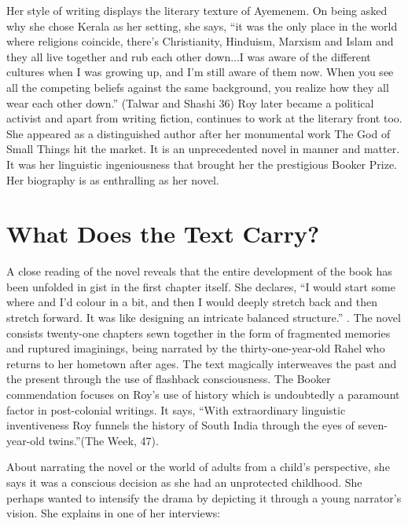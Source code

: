 Her  style  of  writing  displays  the  literary  texture  of  Ayemenem.  On  being  asked  why  she  chose  Kerala  as  her  setting,  she  says,  “it  was  the  only  place  in  the  world  where  religions  coincide,  there’s  Christianity,  Hinduism,  Marxism  and  Islam  and  they  all  live  together  and  rub  each  other  down...I  was  aware  of  the  different  cultures  when  I  was  growing  up,  and  I’m  still  aware  of  them  now.  When  you  see  all  the  competing  beliefs  against  the  same  background,  you  realize  how  they  all  wear  each  other  down.” (Talwar and Shashi 36)    Roy  later  became  a  political  activist  and  apart  from  writing  fiction,  continues  to  work  at  the  literary  front  too.  She  appeared  as  a  distinguished  author  after  her  monumental  work  The  God  of  Small  Things  hit  the  market.  It  is  an  unprecedented  novel  in  manner  and  matter.  It  was  her  linguistic  ingeniousness  that  brought  her  the  prestigious  Booker  Prize.  Her  biography  is  as  enthralling  as  her  novel.

\section{What Does the Text Carry?}

A  close  reading  of  the  novel  reveals  that  the  entire  development  of  the  book  has  been  unfolded  in  gist  in  the  first  chapter  itself.  She  declares,  “I  would  start  some  where  and  I’d  colour  in  a  bit,  and  then  I  would  deeply  stretch  back  and  then  stretch  forward.  It  was  like  designing  an  intricate  balanced  structure.”  \parencite{TalwarShashi}.  The  novel  consists  twenty-one  chapters  sewn  together  in  the  form  of  fragmented  memories  and  ruptured  imaginings,  being  narrated  by  the  thirty-one-year-old  Rahel  who  returns  to  her  hometown  after  ages.  The  text  magically  interweaves  the  past  and  the  present  through  the  use  of  flashback  consciousness.  The  Booker  commendation  focuses  on  Roy’s  use  of  history  which  is  undoubtedly  a  paramount  factor  in  post-colonial  writings.  It  says,  “With  extraordinary  linguistic  inventiveness  Roy  funnels  the  history  of  South  India  through  the  eyes  of  seven-year-old  twins.”(The  Week,  47).


About  narrating  the  novel  or  the  world  of  adults  from  a  child’s  perspective,  she  says  it  was  a  conscious  decision  as  she  had  an  unprotected  childhood.  She  perhaps  wanted  to  intensify  the  drama  by  depicting  it  through  a  young  narrator’s  vision.  She  explains  in  one  of  her  interviews:

